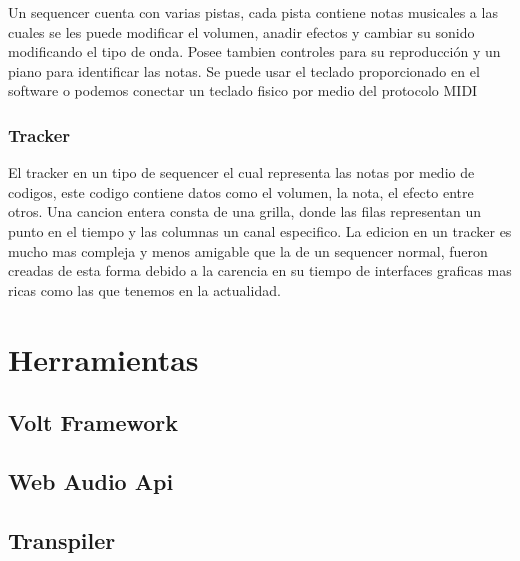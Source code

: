 Un sequencer cuenta con varias pistas, cada pista contiene notas musicales
a las cuales se les puede modificar el volumen, anadir efectos y cambiar
su sonido modificando el tipo de onda. Posee tambien controles para su
reproducción y un piano para identificar las notas. Se puede usar
el teclado proporcionado en el software o podemos conectar un teclado
fisico por medio del protocolo MIDI

\subsubsection{Tracker}

El tracker en un tipo de sequencer el cual representa las notas por medio
de codigos, este codigo contiene datos como el volumen, la nota, el efecto
entre otros. Una cancion entera consta de una grilla, donde las filas
representan un punto en el tiempo y las columnas un canal especifico.
La edicion en un tracker es mucho mas compleja y menos amigable que
la de un sequencer normal, fueron creadas de esta forma debido a la
carencia en su tiempo de interfaces graficas mas ricas como las que
tenemos en la actualidad.

\section{Herramientas}

\subsection{Volt Framework}
\subsection{Web Audio Api}
\subsection{Transpiler}
